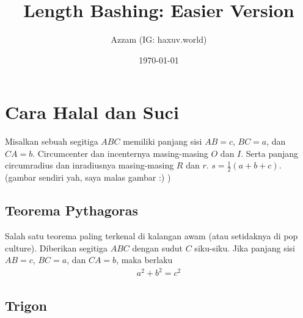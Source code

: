 \documentclass[12pt]{scrartcl}
\title{Length Bashing: Easier Version}
\author{Azzam (IG: haxuv.world)}
\date{\today}
\begin{document}
\maketitle

\renewcommand*\contentsname{Daftar Isi}
\tableofcontents

\newpage

\section{Cara Halal dan Suci}
Misalkan sebuah segitiga $ABC$ memiliki panjang sisi $AB=c$, $BC=a$, dan $CA=b$. Circumcenter dan incenternya masing-masing $O$ dan $I$. Serta panjang circumradius dan inradiusnya masing-masing $R$ dan $r$. $s=\frac{1}{2}(a+b+c)$. (gambar sendiri yah, saya malas gambar :) )

\subsection{Teorema Pythagoras}
Salah satu teorema paling terkenal di kalangan awam (atau setidaknya di pop culture). Diberikan segitiga $ABC$ dengan sudut $C$ siku-siku. Jika panjang sisi $AB=c$, $BC=a$, dan $CA=b$, maka berlaku
\begin{align*}
    a^2+b^2=c^2
\end{align*}
\begin{center}
\end{center}

\subsection{Trigon}
\end{document}

